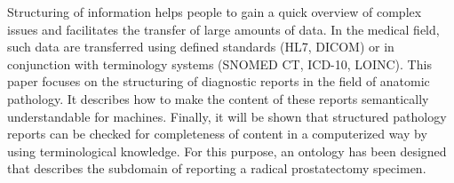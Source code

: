 Structuring of information helps people to gain a quick overview of complex issues and facilitates the transfer of large amounts of data. In the medical field, such data are transferred using defined standards (HL7, DICOM) or in conjunction with terminology systems (SNOMED CT, ICD-10, LOINC). This paper focuses on the structuring of diagnostic reports in the field of anatomic pathology. It describes how to make the content of these reports semantically understandable for machines. Finally, it will be shown that structured pathology reports can be checked for completeness of content in a computerized way by using terminological knowledge. For this purpose, an ontology has been designed that describes the subdomain of reporting a radical prostatectomy specimen.
